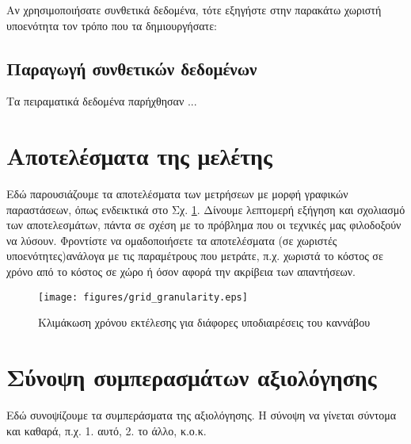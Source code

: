 Αν χρησιμοποιήσατε συνθετικά δεδομένα, τότε εξηγήστε στην παρακάτω χωριστή υποενότητα τον τρόπο που τα δημιουργήσατε:

\subsection{Παραγωγή συνθετικών δεδομένων}

Τα πειραματικά δεδομένα παρήχθησαν ...


\section{Αποτελέσματα της μελέτης}

Εδώ παρουσιάζουμε τα αποτελέσματα των μετρήσεων με μορφή γραφικών παραστάσεων, όπως ενδεικτικά στο Σχ. \ref{GridGranularity}. Δίνουμε λεπτομερή εξήγηση και σχολιασμό των αποτελεσμάτων, πάντα σε σχέση με το πρόβλημα που οι τεχνικές μας φιλοδοξούν να λύσουν. 
Φροντίστε να ομαδοποιήσετε τα αποτελέσματα (σε χωριστές υποενότητες)ανάλογα με τις παραμέτρους που μετράτε, π.χ. χωριστά το κόστος σε χρόνο από το κόστος σε χώρο ή όσον αφορά την ακρίβεια των απαντήσεων.

\begin{figure}[t!]
\texttt{[image: figures/grid\_granularity.eps]}
\centering
\caption{Κλιμάκωση χρόνου εκτέλεσης για διάφορες υποδιαιρέσεις του καννάβου}	
\label{GridGranularity}
\end{figure} 


\section{Σύνοψη συμπερασμάτων αξιολόγησης}

Εδώ συνοψίζουμε τα συμπεράσματα της αξιολόγησης. Η σύνοψη να γίνεται σύντομα και καθαρά, π.χ. 1. αυτό, 2. το άλλο, κ.ο.κ.

